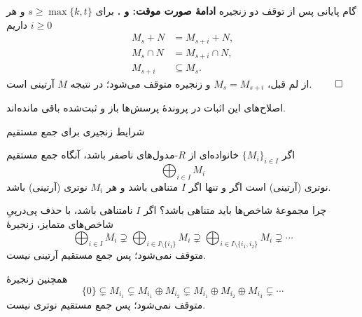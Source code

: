 \begin{frame}[t]{گام پایانی پس از توقف دو زنجیره}
    \label{lec11:artinian-extension-end}
    \textbf{ادامهٔ صورت موقت:  و .}
    برای $s\geqslant\max\{k,t\}$ و هر $i\geqslant0$ داریم
    \[
        \begin{aligned}
            M_s+N&=M_{s+i}+N,\\
            M_s\cap N&=M_{s+i}\cap N,\\
            M_{s+i}&\subseteq M_s.
        \end{aligned}
    \]
    از لم قبل، $M_s=M_{s+i}$ و زنجیره متوقف می‌شود؛ در نتیجه $M$ آرتینی است.
    \hfill\(\qed\)

    \medskip
    اصلاح‌های این اثبات در پروندهٔ پرسش‌ها باز و ثبت‌شده باقی مانده‌اند.
\end{frame}

\begin{frame}[t]{شرایط زنجیری برای جمع مستقیم}
    \label{lec11:direct-sum-criterion}
    \begin{theorem}
        اگر $\{M_i\}_{i\in I}$ خانواده‌ای از $R$-مدول‌های ناصفر باشد،
        آنگاه جمع مستقیم
        \[
            \bigoplus_{i\in I}M_i
        \]
        نوتری \textup{(آرتینی)} است اگر و تنها اگر $I$ متناهی باشد
        و هر $M_i$ نوتری \textup{(آرتینی)} باشد.
    \end{theorem}
\end{frame}

\begin{frame}[t]{چرا مجموعهٔ شاخص‌ها باید متناهی باشد؟}
    \label{lec11:direct-sum-infinite}
    اگر $I$ نامتناهی باشد، با حذف پی‌درپیِ شاخص‌های متمایز، زنجیرهٔ
    \[
        \bigoplus_{i\in I}M_i
        \supsetneq\bigoplus_{i\in I\setminus\{i_1\}}M_i
        \supsetneq\bigoplus_{i\in I\setminus\{i_1,i_2\}}M_i
        \supsetneq\cdots
    \]
    متوقف نمی‌شود؛ پس جمع مستقیم آرتینی نیست.

    همچنین زنجیرهٔ
    \[
        \{0\}\subsetneq M_{i_1}
        \subsetneq M_{i_1}\oplus M_{i_2}
        \subsetneq M_{i_1}\oplus M_{i_2}\oplus M_{i_3}
        \subsetneq\cdots
    \]
    متوقف نمی‌شود؛ پس جمع مستقیم نوتری نیست.
\end{frame}

